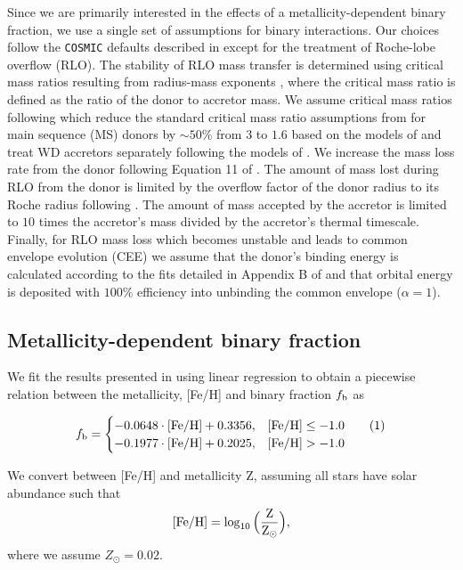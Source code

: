 \documentclass[twocolumn]{aastex631}
\newcommand\numberthis{\addtocounter{equation}{1}\tag{\theequation}}
\begin{document}
Since we are primarily interested in the effects of a metallicity-dependent binary fraction, we use a single set of assumptions for binary interactions. Our choices follow the \texttt{COSMIC} defaults described in \citet{Breivik2020a} except for the treatment of Roche-lobe overflow (RLO). The stability of RLO mass transfer is determined using critical mass ratios resulting from radius-mass exponents \citep{Webbink1985, Hurley2002}, where the critical mass ratio is defined as the ratio of the donor to accretor mass. We assume critical mass ratios following \citet{Claeys2014} which reduce the standard critical mass ratio assumptions from \citet{Hurley2002} for main sequence (MS) donors by $\sim50\%$ from $3$ to $1.6$ based on the models of \citet{deMink2007} and treat WD accretors separately following the models of \citet{Soberman1997}. We increase the mass loss rate from the donor following Equation 11 of \citet{Claeys2014}. The amount of mass lost during RLO from the donor is limited by the overflow factor of the donor radius to its Roche radius following \citet{Hurley2002}. The amount of mass accepted by the accretor is limited to $10$ times the accretor's mass divided by the accretor's thermal timescale. Finally, for RLO mass loss which becomes unstable and leads to common envelope evolution (CEE) we assume that the donor's binding energy is calculated according to the fits detailed in Appendix B of \citet{Claeys2014} and that orbital energy is deposited with $100\%$ efficiency into unbinding the common envelope ($\alpha=1$).

\subsection{Metallicity-dependent binary fraction}
We fit the results presented in \citet{Moe2019} using linear regression to obtain a piecewise relation between the metallicity, [Fe/H] and binary fraction $f_{\rm{b}}$ as

\[f_{\rm{b}}= \begin{cases} 
      - 0.0648 \cdot [\rm{Fe/H}] + 0.3356, & [\rm{Fe/H}]\leq -1.0 \numberthis \\
      -0.1977 \cdot [\rm{Fe/H}] + 0.2025, & [\rm{Fe/H}]> -1.0  
   \end{cases}
\]


\noindent We convert between [Fe/H] and metallicity Z, assuming all stars have solar abundance such that
\begin{equation}
\label{eq:metallicity}
    [\rm{Fe/H}] = \log_{10}\Big(\frac{Z}{Z_{\odot}}\Big),
\end{equation}
\noindent where we assume $Z_{\odot}=0.02$.
\end{document}
